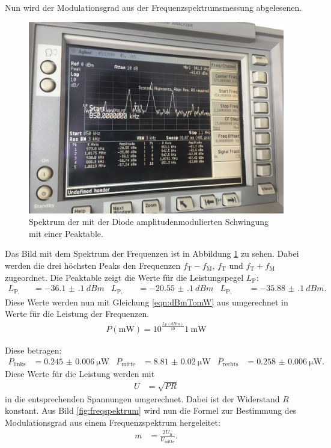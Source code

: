 Nun wird der Modulationsgrad aus der Frequenzspektrumsmessung abgelesenen.
\begin{figure}[h]
  \centering
  \includegraphics[width=.9\textwidth]{Spektrum_Pics/c.jpg}
  \caption{Spektrum der mit der Diode amplitudenmodulierten Schwingung mit einer Peaktable.}
  \label{fig:c}
\end{figure}
Das Bild mit dem Spektrum der Frequenzen ist in Abbildung \ref{fig:c} zu sehen.
Dabei werden die drei höchsten Peaks den Frequenzen $f_\text{T} - f_\text{M}$, $f_\text{T}$ und $f_\text{T} + f_\text{M}$ zugeordnet.
Die Peaktable zeigt die Werte für die Leistungspegel $L_\text{P}$:
\begin{align*}
  L_\text{P, links} &= \SI{-36.1(1)}{dBm} & L_\text{P, mitte} &= \SI{-20.55(10)}{dBm} & L_\text{P, rechts} &= \SI{-35.88(10)}{dBm}.
\end{align*}
Diese Werte werden nun mit Gleichung \eqref{eqn:dBmTomW} aus \cite{leistungspegel} umgerechnet in Werte für die Leistung der Frequenzen.
\begin{align}
  P(\si{\milli\watt}) =
   10^{\frac{L_\text{P}(\si{dBm})}{10}} \SI{1}{\milli\watt} \label{eqn:dBmTomW}
\end{align}

Diese betragen:
\begin{align*}
  P_\text{links} &= \SI{0.245(6)}{\micro\watt} & P_\text{mitte} &= \SI{8.81(2)}{\micro\watt} & P_\text{rechts} &= \SI{0.258(6)}{\micro\watt}.
\end{align*}
Diese Werte für die Leistung werden mit
\begin{align}
  U &= \sqrt{P R}
\end{align}
in die entsprechenden Spannungen umgerechnet. Dabei ist der Widerstand $R$ konstant.
Aus Bild \ref{fig:freqspektrum} wird nun die Formel zur Bestimmung des Modulationsgrad aus einem Frequenzspektrum hergeleitet:
\begin{align*}
  m &= \frac{2 U_\text{lr}}{U_\text{mitte}}.
\end{align*}


